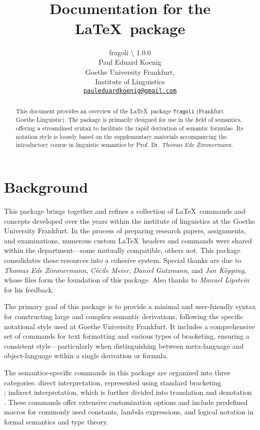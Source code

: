 \documentclass[10pt, a4paper]{article}
\title{\FraGoLi\\Documentation for the \LaTeX\ package \texttt{\her{fragoli}}}
\author{fragoli \textbackslash\text{v} 1.0.0\\Paul Eduard Koenig\\Goethe University Frankfurt,\\Institute of Linguistics\\\texttt{\href{mailto:pauleduardkoenig@gmail.com}{pauleduardkoenig@gmail.com}}}
\begin{document}
	\maketitle
	\begin{abstract}
		This document provides an overview of the \LaTeX\ package \texttt{fragoli} (Frankfurt Goethe Linguistic). The package is primarily designed for use in the field of semantics, offering a streamlined syntax to facilitate the rapid derivation of semantic formulae. Its notation style is loosely based on the supplementary materials accompanying the introductory course in linguistic semantics by Prof. Dr. \textit{Thomas Ede Zimmermann}.
	\end{abstract}
	\tableofcontents
	\section{Background}
	This package brings together and refines a collection of \LaTeX\ commands and concepts developed over the years within the institute of linguistics at the Goethe University Frankfurt. In the process of preparing research papers, assignments, and examinations, numerous custom \LaTeX\ headers and commands were shared within the department—some mutually compatible, others not. This package consolidates these resources into a cohesive system. Special thanks are due to \textit{Thomas Ede Zimmermann}, \textit{Cécile Meier}, \textit{Daniel Gutzmann}, and \textit{Jan Köpping}, whose files form the foundation of this package. Also thanks to \textit{Manuel Lipstein} for his feedback. 
	
	The primary goal of this package is to provide a minimal and user-friendly syntax for constructing large and complex semantic derivations, following the specific notational style used at Goethe University Frankfurt. It includes a comprehensive set of commands for text formatting and various types of bracketing, ensuring a consistent style—particularly when distinguishing between meta-language and object-language within a single derivation or formula.
	
	The semantics-specific commands in this package are organized into three categories: direct interpretation, represented using standard bracketing \\; indirect interpretation, which is further divided into translation  and denotation . These commands offer extensive customization options and include predefined macros for commonly used constants, lambda expressions, and logical notation in formal semantics and type theory.
	
\end{document}
